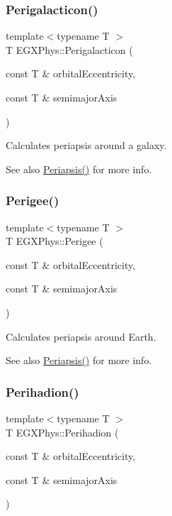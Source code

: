 \subsubsection{\texorpdfstring{Perigalacticon()}{Perigalacticon()}}
{\footnotesize\ttfamily template$<$typename T $>$ \\
T E\+G\+X\+Phys\+::\+Perigalacticon (\begin{DoxyParamCaption}\item[{const T \&}]{orbital\+Eccentricity,  }\item[{const T \&}]{semimajor\+Axis }\end{DoxyParamCaption})}



Calculates periapsis around a galaxy. 

\begin{DoxySeeAlso}{See also}
\hyperlink{group___periapsis_ga4414ac75539371ec874a3d25cad6c9fe}{Periapsis()} for more info. 
\end{DoxySeeAlso}
\mbox{\label{group___periapsis_gae2d053caf69cb0b4c3207064a2ab143a}} 
\subsubsection{\texorpdfstring{Perigee()}{Perigee()}}
{\footnotesize\ttfamily template$<$typename T $>$ \\
T E\+G\+X\+Phys\+::\+Perigee (\begin{DoxyParamCaption}\item[{const T \&}]{orbital\+Eccentricity,  }\item[{const T \&}]{semimajor\+Axis }\end{DoxyParamCaption})}



Calculates periapsis around Earth. 

\begin{DoxySeeAlso}{See also}
\hyperlink{group___periapsis_ga4414ac75539371ec874a3d25cad6c9fe}{Periapsis()} for more info. 
\end{DoxySeeAlso}
\mbox{\label{group___periapsis_gafb16e46e55078b38604eef0d7c7c40c4}} 
\subsubsection{\texorpdfstring{Perihadion()}{Perihadion()}}
{\footnotesize\ttfamily template$<$typename T $>$ \\
T E\+G\+X\+Phys\+::\+Perihadion (\begin{DoxyParamCaption}\item[{const T \&}]{orbital\+Eccentricity,  }\item[{const T \&}]{semimajor\+Axis }\end{DoxyParamCaption})}




